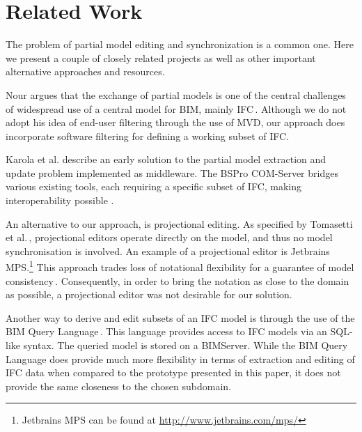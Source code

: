 \section{Related Work}
\label{sec:related_work}
The problem of partial model editing and synchronization is a common one. Here we present a couple of closely related projects as well as other important alternative approaches and resources.

Nour argues that the exchange of partial models is one of the central challenges of widespread use of a central model for BIM, mainly IFC\,\cite{nour08}. Although we do not adopt his idea of end-user filtering through the use of MVD, our approach does incorporate software filtering for defining a working subset of IFC.

Karola et al. describe an early solution to the partial model extraction and update problem implemented as middleware. The BSPro COM-Server bridges various existing tools, each requiring a specific subset of IFC, making interoperability possible \cite{karola02}.

An alternative to our approach, is projectional editing. As specified by Tomasetti et al.\,\cite{tomasetti11}, projectional editors operate directly on the model, and thus no model synchronisation is involved. An example of a projectional editor is Jetbrains MPS.\footnote{Jetbrains MPS can be found at \url{http://www.jetbrains.com/mps/}} This approach trades loss of notational flexibility for a guarantee of model consistency\,\cite{conf/models/Voelter10}. Consequently, in order to bring the notation as close to the domain as possible, a projectional editor was not desirable for our solution.

Another way to derive and edit subsets of an IFC model is through the use of the BIM Query Language\,\cite{mazairac10}. This language provides access to IFC models via an SQL-like syntax. The queried model is stored on a BIMServer. While the BIM Query Language does provide much more flexibility in terms of extraction and editing of IFC data when compared to the prototype presented in this paper, it does not provide the same closeness to the chosen subdomain.

